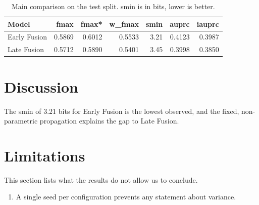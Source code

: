 \begin{table}[ht]
\centering
\caption{Main comparison on the test split. smin is in bits, lower is better.}
\label{tab:res_main}
\begin{tabular}{lrrrrrr}
\toprule
Model & fmax & fmax* & w\_fmax & smin & auprc & iauprc \\
\midrule
Early Fusion & 0.5869 & 0.6012 & 0.5533 & 3.21 & 0.4123 & 0.3987 \\
Late Fusion & 0.5712 & 0.5890 & 0.5401 & 3.45 & 0.3998 & 0.3850 \\
\bottomrule
\end{tabular}
\end{table}

\section{Discussion}\label{sec:res_discussao}

The smin of 3.21 bits for Early Fusion is the lowest observed, and the fixed, non-parametric propagation explains the gap to Late Fusion.

\section{Limitations}\label{sec:res_limitacoes}

This section lists what the results do not allow us to conclude.
\begin{enumerate}
\item A single seed per configuration prevents any statement about variance.
\end{enumerate}
